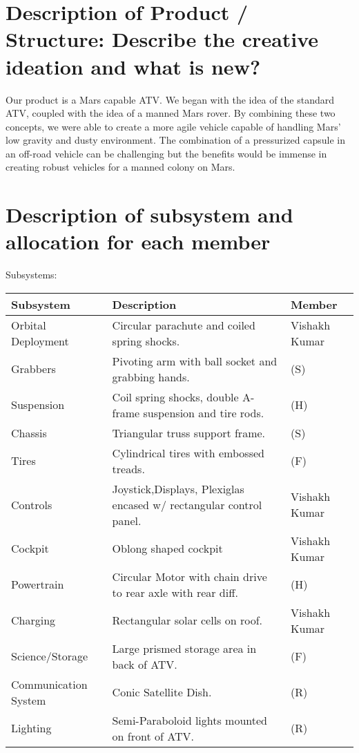 \section{Description of Product / Structure: Describe the creative ideation and what is new?}

Our product is a Mars capable ATV. We began with the idea of the standard ATV, coupled with the idea of a manned Mars rover. By combining these two concepts, we were able to create a more agile vehicle capable of handling Mars’ low gravity and dusty environment. The combination of a pressurized capsule in an off-road vehicle can be challenging but the benefits would be immense in creating robust vehicles for a manned colony on Mars.

\section{Description of subsystem and allocation for each member}

Subsystems:
\begin{center}
\begin{tabular}{lll}
\hline
Subsystem & Description & Member\\
\hline
Orbital Deployment & Circular parachute and coiled spring shocks. & Vishakh Kumar\\
Grabbers & Pivoting arm with ball socket and grabbing hands. & (S)\\
Suspension & Coil spring shocks, double A-frame suspension and tire rods. & (H)\\
Chassis & Triangular truss support frame. & (S)\\
Tires & Cylindrical tires with embossed treads. & (F)\\
Controls & Joystick,Displays, Plexiglas encased w/ rectangular control panel. & Vishakh Kumar\\
Cockpit & Oblong shaped cockpit & Vishakh Kumar\\
Powertrain & Circular Motor with chain drive to rear axle with rear diff. & (H)\\
Charging & Rectangular solar cells on roof. & Vishakh Kumar\\
Science/Storage & Large prismed storage area in back of ATV. & (F)\\
Communication System & Conic Satellite Dish. & (R)\\
Lighting & Semi-Paraboloid lights mounted on front of ATV. & (R)\\
\hline
\end{tabular}
\end{center}

